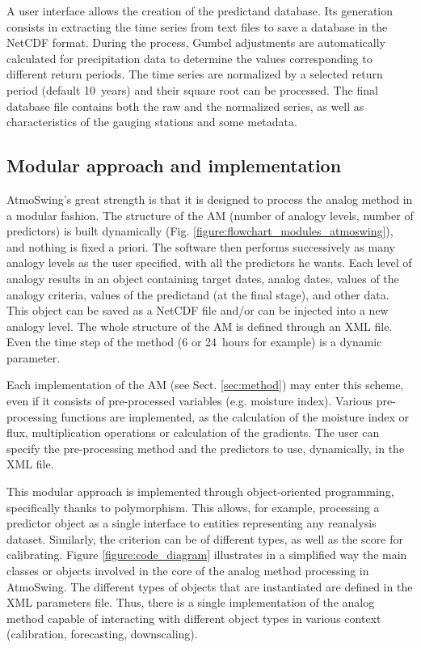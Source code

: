 \documentclass[review]{elsarticle}
\begin{document}
A user interface allows the creation of the predictand database. Its generation consists in extracting the time series from text files to save a database in the NetCDF format. During the process, Gumbel adjustments are automatically calculated for precipitation data to determine the values corresponding to different return periods. The time series are normalized by a selected return period (default 10~years) and their square root can be processed. The final database file contains both the raw and the normalized series, as well as characteristics of the gauging stations and some metadata.


\subsection{Modular approach and implementation}

AtmoSwing's great strength is that it is designed to process the analog method in a modular fashion. The structure of the AM (number of analogy levels, number of predictors) is built dynamically (Fig. \ref{figure:flowchart_modules_atmoswing}), and nothing is fixed a priori. The software then performs successively as many analogy levels as the user specified, with all the predictors he wants. Each level of analogy results in an object containing target dates, analog dates, values of the analogy criteria, values of the predictand (at the final stage), and other data. This object can be saved as a NetCDF file and/or can be injected into a new analogy level. The whole structure of the AM is defined through an XML file. Even the time step of the method (6 or 24~hours for example) is a dynamic parameter.

Each implementation of the AM (see Sect. \ref{sec:method}) may enter this scheme, even if it consists of pre-processed variables (e.g. moisture index). Various pre-processing functions are implemented, as the calculation of the moisture index or flux, multiplication operations or calculation of the gradients. The user can specify the pre-processing method and the predictors to use, dynamically, in the XML file.

This modular approach is implemented through object-oriented programming, specifically thanks to polymorphism. This allows, for example, processing a predictor object as a single interface to entities representing any reanalysis dataset. Similarly, the criterion can be of different types, as well as the score for calibrating. Figure \ref{figure:code_diagram} illustrates in a simplified way the main classes or objects involved in the core of the analog method processing in AtmoSwing. The different types of objects that are instantiated are defined in the XML parameters file. Thus, there is a single implementation of the analog method capable of interacting with different object types in various context (calibration, forecasting, downscaling). 
\end{document}

